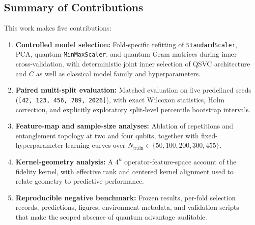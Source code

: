\documentclass[12pt,a4paper]{article}
\begin{document}
\subsection{Summary of Contributions}
This work makes five contributions:
\begin{enumerate}
    \item \textbf{Controlled model selection:} Fold-specific refitting of \texttt{StandardScaler}, PCA, quantum \texttt{MinMaxScaler}, and quantum Gram matrices during inner cross-validation, with deterministic joint inner selection of QSVC architecture and $C$ as well as classical model family and hyperparameters.
    \item \textbf{Paired multi-split evaluation:} Matched evaluation on five predefined seeds (\texttt{[42, 123, 456, 789, 2026]}), with exact Wilcoxon statistics, Holm correction, and explicitly exploratory split-level percentile bootstrap intervals.
    \item \textbf{Feature-map and sample-size analyses:} Ablation of repetitions and entanglement topology at two and four qubits, together with fixed-hyperparameter learning curves over $N_{\text{train}} \in \{50, 100, 200, 300, 455\}$.
    \item \textbf{Kernel-geometry analysis:} A $4^n$ operator-feature-space account of the fidelity kernel, with effective rank and centered kernel alignment used to relate geometry to predictive performance.
    \item \textbf{Reproducible negative benchmark:} Frozen results, per-fold selection records, predictions, figures, environment metadata, and validation scripts that make the scoped absence of quantum advantage auditable.
\end{enumerate}
\end{document}
